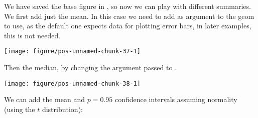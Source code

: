 \documentclass[paper=a4,10pt,div=17,headsepline,BCOR=12mm,twoside,open=right]{scrbook}\usepackage{knitr}
\begin{document}
We have saved the base figure in , so now we can play with different summaries. We first add just the mean. In this case we need to add as argument to  the geom to use, as the default one expects data for plotting error bars, in later examples, this is not needed.

\begin{knitrout}\footnotesize
{}\color{fgcolor}\begin{kframe}
\begin{alltt}
 \hlopt{+} \hlstd{(} \hlstd{=} \hlstd{,} \hlstd{=}\hlstd{,}
                    \hlstd{=}\hlstd{,} \hlstd{=}\hlstd{,} \hlstd{=}\hlstd{)}
\end{alltt}
\end{kframe}

{\centering \texttt{[image: figure/pos-unnamed-chunk-37-1]} 

}



\end{knitrout}

Then the median, by changing the argument passed to .

\begin{knitrout}\footnotesize
{}\color{fgcolor}\begin{kframe}
\begin{alltt}
 \hlopt{+} \hlstd{(} \hlstd{=} \hlstd{,} \hlstd{=}\hlstd{,}
                    \hlstd{=}\hlstd{,} \hlstd{=}\hlstd{,} \hlstd{=}\hlstd{)}
\end{alltt}
\end{kframe}

{\centering \texttt{[image: figure/pos-unnamed-chunk-38-1]} 

}



\end{knitrout}

We can add the mean and $p = 0.95$ confidence intervals assuming normality (using the $t$ distribution):
\end{document}
